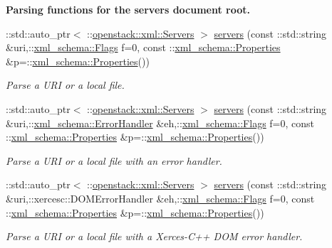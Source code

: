 \begin{Indent}{\bf Parsing functions for the servers document root.}\par
\begin{DoxyCompactItemize}
\item 
::std::auto\_\-ptr$<$ ::\hyperlink{classopenstack_1_1xml_1_1Servers}{openstack::xml::Servers} $>$ \hyperlink{namespaceopenstack_1_1xml_a3b7d778d803861163a44ef0798ed51da}{servers} (const ::std::string \&uri,::\hyperlink{namespacexml__schema_affb4c227cbd9aa7453dd1dc5a1401943}{xml\_\-schema::Flags} f=0, const ::\hyperlink{namespacexml__schema_ad27ce19a7ee1d3b1064092648898f64c}{xml\_\-schema::Properties} \&p=::\hyperlink{namespacexml__schema_ad27ce19a7ee1d3b1064092648898f64c}{xml\_\-schema::Properties}())
\begin{DoxyCompactList}\small\item\em Parse a URI or a local file. \item\end{DoxyCompactList}\item 
::std::auto\_\-ptr$<$ ::\hyperlink{classopenstack_1_1xml_1_1Servers}{openstack::xml::Servers} $>$ \hyperlink{namespaceopenstack_1_1xml_a918159ab505afbd1451375107dbd83f5}{servers} (const ::std::string \&uri,::\hyperlink{namespacexml__schema_ab1c9361bfd3b404eaabf0c31eded79dc}{xml\_\-schema::ErrorHandler} \&eh,::\hyperlink{namespacexml__schema_affb4c227cbd9aa7453dd1dc5a1401943}{xml\_\-schema::Flags} f=0, const ::\hyperlink{namespacexml__schema_ad27ce19a7ee1d3b1064092648898f64c}{xml\_\-schema::Properties} \&p=::\hyperlink{namespacexml__schema_ad27ce19a7ee1d3b1064092648898f64c}{xml\_\-schema::Properties}())
\begin{DoxyCompactList}\small\item\em Parse a URI or a local file with an error handler. \item\end{DoxyCompactList}\item 
::std::auto\_\-ptr$<$ ::\hyperlink{classopenstack_1_1xml_1_1Servers}{openstack::xml::Servers} $>$ \hyperlink{namespaceopenstack_1_1xml_a73651a91ace0bc1d08d8d90aaaa6eba7}{servers} (const ::std::string \&uri,::xercesc::DOMErrorHandler \&eh,::\hyperlink{namespacexml__schema_affb4c227cbd9aa7453dd1dc5a1401943}{xml\_\-schema::Flags} f=0, const ::\hyperlink{namespacexml__schema_ad27ce19a7ee1d3b1064092648898f64c}{xml\_\-schema::Properties} \&p=::\hyperlink{namespacexml__schema_ad27ce19a7ee1d3b1064092648898f64c}{xml\_\-schema::Properties}())
\begin{DoxyCompactList}\small\item\em Parse a URI or a local file with a Xerces-\/C++ DOM error handler. \item\end{DoxyCompactList}\item 

\end{DoxyCompactItemize}
\end{Indent}
